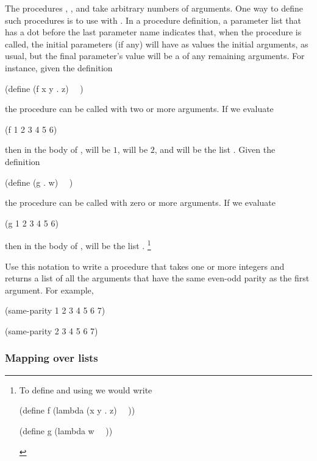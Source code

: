 \begin{exercise}
	\label{Exercise 2.20}
	The procedures \code{+}, \code{*}, and  take arbitrary numbers of arguments.
	One way to define such procedures is to use  with .
	In a procedure definition, a parameter list that has a dot before the last parameter name indicates that, when the procedure is called, the initial parameters (if any) will have as values the initial arguments, as usual, but the final parameter’s value will be a  of any remaining arguments.
	For instance, given the definition
	\begin{scheme}
	  (define (f x y . z) ~~)
	\end{scheme}
	the procedure  can be called with two or more arguments.
	If we evaluate
	\begin{scheme}
	  (f 1 2 3 4 5 6)
	\end{scheme}
	then in the body of ,  will be \( 1 \),  will be \( 2 \), and  will be the list \code{(3 4 5 6)}.
	Given the definition
	\begin{scheme}
	  (define (g . w) ~~)
	\end{scheme}
	the procedure  can be called with zero or more arguments.
	If we evaluate
	\begin{scheme}
	  (g 1 2 3 4 5 6)
	\end{scheme}
	then in the body of ,  will be the list .%
	\footnote{
		To define  and  using  we would write
		\begin{smallscheme}
		  (define f (lambda (x y . z) ~\cvar{⟨body⟩}~))

		  (define g (lambda w ~\cvar{⟨body⟩}~))
		\end{smallscheme}
	}

	Use this notation to write a procedure  that takes one or more integers and returns a list of all the arguments that have the same even-odd parity as the first argument.
	For example,
	\begin{scheme}
	  (same-parity 1 2 3 4 5 6 7)
	  ~\outprint{(1 3 5 7)}~

	  (same-parity 2 3 4 5 6 7)
	  ~\outprint{(2 4 6)}~
	\end{scheme}
\end{exercise}



\subsubsection*{Mapping over lists}

